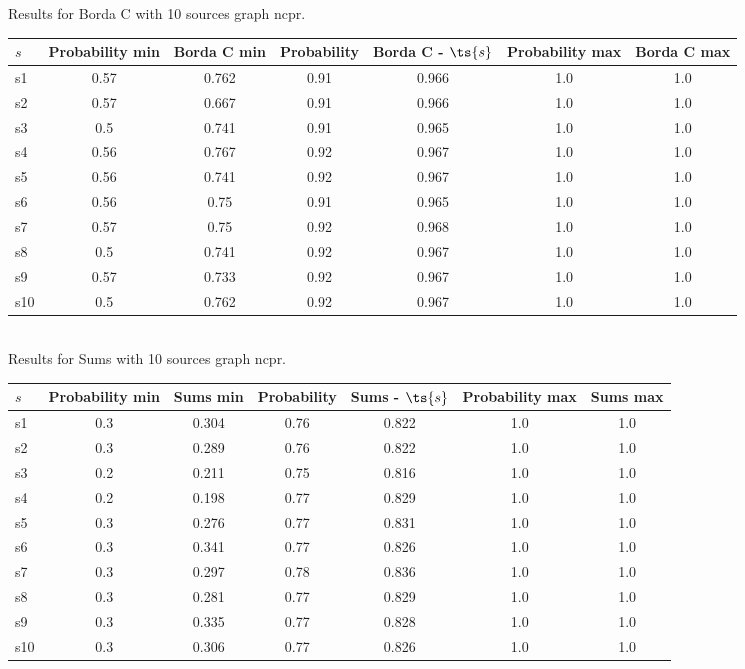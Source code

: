 \documentclass{article}
\begin{document}
\noindent Results for Borda C with 10 sources graph ncpr.

\noindent\begin{tabular}{|l|c|c|c|c|c|c|}
\hline
$s$& Probability min & Borda C min & Probability & Borda C - $\ts{s}$ & Probability max & Borda C max\\
\hline
s1 &0.57 & 0.762 & 0.91 & 0.966 & 1.0 & 1.0\\
\hline
s2 &0.57 & 0.667 & 0.91 & 0.966 & 1.0 & 1.0\\
\hline
s3 &0.5 & 0.741 & 0.91 & 0.965 & 1.0 & 1.0\\
\hline
s4 &0.56 & 0.767 & 0.92 & 0.967 & 1.0 & 1.0\\
\hline
s5 &0.56 & 0.741 & 0.92 & 0.967 & 1.0 & 1.0\\
\hline
s6 &0.56 & 0.75 & 0.91 & 0.965 & 1.0 & 1.0\\
\hline
s7 &0.57 & 0.75 & 0.92 & 0.968 & 1.0 & 1.0\\
\hline
s8 &0.5 & 0.741 & 0.92 & 0.967 & 1.0 & 1.0\\
\hline
s9 &0.57 & 0.733 & 0.92 & 0.967 & 1.0 & 1.0\\
\hline
s10 &0.5 & 0.762 & 0.92 & 0.967 & 1.0 & 1.0\\
\hline
\end{tabular}\\

\noindent Results for Sums with 10 sources graph ncpr.

\noindent\begin{tabular}{|l|c|c|c|c|c|c|}
\hline
$s$& Probability min & Sums min & Probability & Sums - $\ts{s}$ & Probability max & Sums max\\
\hline
s1 &0.3 & 0.304 & 0.76 & 0.822 & 1.0 & 1.0\\
\hline
s2 &0.3 & 0.289 & 0.76 & 0.822 & 1.0 & 1.0\\
\hline
s3 &0.2 & 0.211 & 0.75 & 0.816 & 1.0 & 1.0\\
\hline
s4 &0.2 & 0.198 & 0.77 & 0.829 & 1.0 & 1.0\\
\hline
s5 &0.3 & 0.276 & 0.77 & 0.831 & 1.0 & 1.0\\
\hline
s6 &0.3 & 0.341 & 0.77 & 0.826 & 1.0 & 1.0\\
\hline
s7 &0.3 & 0.297 & 0.78 & 0.836 & 1.0 & 1.0\\
\hline
s8 &0.3 & 0.281 & 0.77 & 0.829 & 1.0 & 1.0\\
\hline
s9 &0.3 & 0.335 & 0.77 & 0.828 & 1.0 & 1.0\\
\hline
s10 &0.3 & 0.306 & 0.77 & 0.826 & 1.0 & 1.0\\
\hline
\end{tabular}\\
\end{document}
